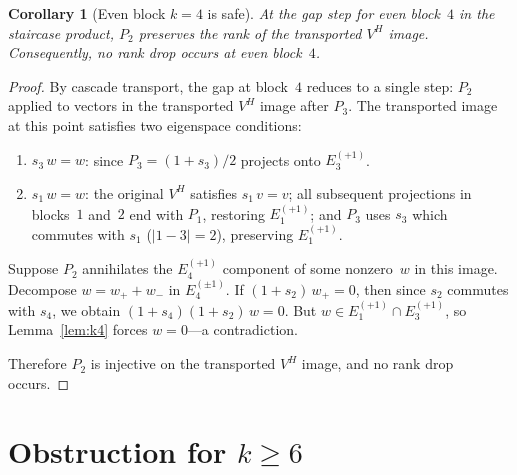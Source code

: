 \documentclass[11pt]{article}
\newtheorem{corollary}[theorem]{Corollary}
\theoremstyle{definition}
\theoremstyle{remark}
\begin{document}
\begin{corollary}[Even block $k = 4$ is safe]\label{cor:k4-safe}
At the gap step for even block~$4$ in the staircase product, $P_2$
preserves the rank of the transported $V^H$ image.  Consequently, no
rank drop occurs at even block~$4$.
\end{corollary}

\begin{proof}
By cascade transport, the gap at block~$4$ reduces to a single step:
$P_2$ applied to vectors in the transported $V^H$ image after $P_3$.
The transported image at this point satisfies two eigenspace conditions:

\begin{enumerate}
  \item $s_3\, w = w$: since $P_3 = (1 + s_3)/2$ projects onto
    $E_3^{(+1)}$.
  \item $s_1\, w = w$: the original $V^H$ satisfies $s_1\, v = v$;
    all subsequent projections in blocks~$1$ and~$2$ end with $P_1$,
    restoring $E_1^{(+1)}$; and $P_3$ uses $s_3$ which commutes with
    $s_1$ ($|1 - 3| = 2$), preserving $E_1^{(+1)}$.
\end{enumerate}

Suppose $P_2$ annihilates the $E_4^{(+1)}$ component of some
nonzero~$w$ in this image.  Decompose $w = w_+ + w_-$ in
$E_4^{(\pm 1)}$.  If $(1 + s_2)\, w_+ = 0$, then since
$s_2$ commutes with $s_4$, we obtain $(1 + s_4)(1 + s_2)\, w = 0$.
But $w \in E_1^{(+1)} \cap E_3^{(+1)}$, so
Lemma~\ref{lem:k4} forces $w = 0$---a contradiction.

Therefore $P_2$ is injective on the transported $V^H$ image, and
no rank drop occurs.
\end{proof}


\section{Obstruction for $k \ge 6$}
\end{document}
